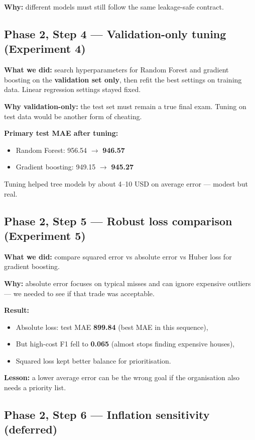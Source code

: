 \documentclass[11pt,a4paper]{article}
\begin{document}
\textbf{Why:} different models must still follow the same leakage-safe contract.

\subsection{Phase 2, Step 4 --- Validation-only tuning (Experiment 4)}

\textbf{What we did:} search hyperparameters for Random Forest and gradient boosting on the \textbf{validation set only}, then refit the best settings on training data. Linear regression settings stayed fixed.

\textbf{Why validation-only:} the test set must remain a true final exam. Tuning on test data would be another form of cheating.

\textbf{Primary test MAE after tuning:}
\begin{itemize}
  \item Random Forest: 956.54 $\rightarrow$ \textbf{946.57}
  \item Gradient boosting: 949.15 $\rightarrow$ \textbf{945.27}
\end{itemize}

Tuning helped tree models by about 4--10 USD on average error --- modest but real.

\subsection{Phase 2, Step 5 --- Robust loss comparison (Experiment 5)}

\textbf{What we did:} compare squared error vs absolute error vs Huber loss for gradient boosting.

\textbf{Why:} absolute error focuses on typical misses and can ignore expensive outliers --- we needed to see if that trade was acceptable.

\textbf{Result:}
\begin{itemize}
  \item Absolute loss: test MAE \textbf{899.84} (best MAE in this sequence),
  \item But high-cost F1 fell to \textbf{0.065} (almost stops finding expensive houses),
  \item Squared loss kept better balance for prioritisation.
\end{itemize}

\textbf{Lesson:} a lower average error can be the wrong goal if the organisation also needs a priority list.

\subsection{Phase 2, Step 6 --- Inflation sensitivity (deferred)}
\end{document}
